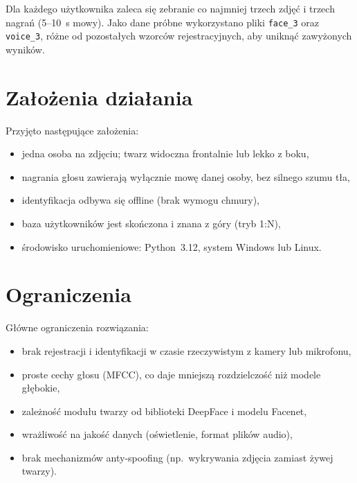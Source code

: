 Dla każdego użytkownika zaleca się zebranie co najmniej trzech zdjęć i trzech nagrań (5--10~s mowy). Jako dane próbne wykorzystano pliki \texttt{face\_3} oraz \texttt{voice\_3}, różne od pozostałych wzorców rejestracyjnych, aby uniknąć zawyżonych wyników.

\section{Założenia działania}

Przyjęto następujące założenia:
\begin{itemize}
    \item jedna osoba na zdjęciu; twarz widoczna frontalnie lub lekko z boku,
    \item nagrania głosu zawierają wyłącznie mowę danej osoby, bez silnego szumu tła,
    \item identyfikacja odbywa się offline (brak wymogu chmury),
    \item baza użytkowników jest skończona i znana z góry (tryb 1:N),
    \item środowisko uruchomieniowe: Python~3.12, system Windows lub Linux.
\end{itemize}

\section{Ograniczenia}

Główne ograniczenia rozwiązania:
\begin{itemize}
    \item brak rejestracji i identyfikacji w czasie rzeczywistym z kamery lub mikrofonu,
    \item proste cechy głosu (MFCC), co daje mniejszą rozdzielczość niż modele głębokie,
    \item zależność modułu twarzy od biblioteki DeepFace i modelu Facenet,
    \item wrażliwość na jakość danych (oświetlenie, format plików audio),
    \item brak mechanizmów anty-spoofing (np.\ wykrywania zdjęcia zamiast żywej twarzy).
\end{itemize}
